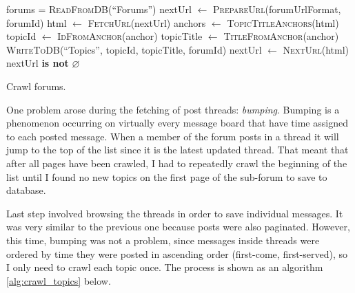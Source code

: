     \begin{algorithm}[H]
      \begin{algorithmic}[1]
          \State forums = \textsc{ReadFromDB}(``Forums'') 
            \State nextUrl $\gets$ \textsc{PrepareUrl}(forumUrlFormat, forumId)
            \Repeat
              \State html $\gets$ \textsc{FetchUrl}(nextUrl)
              \State anchors $\gets$ \textsc{TopicTitleAnchors}(html)
                \State topicId $\gets$ \textsc{IdFromAnchor}(anchor)
                \State topicTitle $\gets$ \textsc{TitleFromAnchor}(anchor)
                \State \textsc{WriteToDB}(``Topics'', topicId, topicTitle, forumId)
              \EndFor
              \State nextUrl $\gets$ \textsc{NextUrl}(html) 
            \Until nextUrl \textbf{is not} $\varnothing$
          \EndFor
        \EndProcedure
      \end{algorithmic}
      \caption{Crawl forums.}
      \label{alg:crawl_forums}
    \end{algorithm}
    
    One problem arose during the fetching of post threads: \emph{bumping}. Bumping is a phenomenon occurring on virtually every message board that have time assigned to each posted message. When a member of the forum posts in a thread it will jump to the top of the list since it is the latest updated thread. That meant that after all pages have been crawled, I had to repeatedly crawl the beginning of the list until I found no new topics on the first page of the sub-forum to save to database.
    
    Last step involved browsing the threads in order to save individual messages. It was very similar to the previous one because posts were also paginated. However, this time, bumping was not a problem, since messages inside threads were ordered by time they were posted in ascending order (first-come, first-served), so I only need to crawl each topic once. The process is shown as an algorithm \ref{alg:crawl_topics} below.
  
